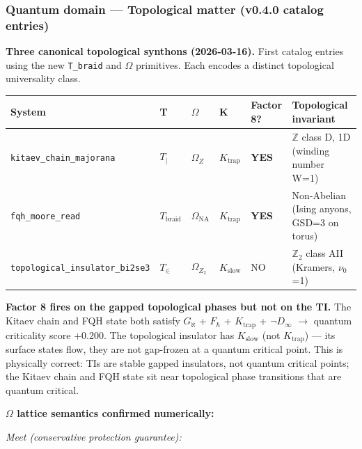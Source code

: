 \documentclass[12pt,a4paper]{article}
\begin{document}
\subsubsection{Quantum domain --- Topological matter (v0.4.0 catalog entries)}

\textbf{Three canonical topological synthons (2026-03-16).} First catalog entries using the new \texttt{T\_braid} and $\Omega$ primitives. Each encodes a distinct topological universality class.

\begin{table}[htbp]
\centering
\small
{}
\begin{tabularx}{\textwidth}{>{\centering\arraybackslash}X >{\centering\arraybackslash}X >{\centering\arraybackslash}X >{\centering\arraybackslash}X >{\centering\arraybackslash}X >{\centering\arraybackslash}X}
\toprule
\rowcolor{gray!25}\textbf{System} & \textbf{T} & \textbf{$\Omega$} & \textbf{K} & \textbf{Factor 8?} & \textbf{Topological invariant} \\
\midrule
\rowcolors{1}{white}{gray!10}
\texttt{kitaev\_chain\_majorana} & $T_{|}$ & $\Omega_Z$ & $K_{\text{trap}}$ & \textbf{YES} & $\mathbb{Z}$ class D, 1D (winding number W=1) \\
\texttt{fqh\_moore\_read} & $T_{\text{braid}}$ & $\Omega_{\text{NA}}$ & $K_{\text{trap}}$ & \textbf{YES} & Non-Abelian (Ising anyons, GSD=3 on torus) \\
\texttt{topological\_insulator\_bi2se3} & $T_{\in}$ & $\Omega_{Z_2}$ & $K_{\text{slow}}$ & NO & $\mathbb{Z}_2$ class AII (Kramers, $\nu_0$=1) \\
\bottomrule
\end{tabularx}
\end{table}

\textbf{Factor 8 fires on the gapped topological phases but not on the TI.} The Kitaev chain and FQH state both satisfy $G_{\aleph}$ + $F_{\hbar}$ + $K_{\text{trap}}$ + $\neg D_{\infty}$ $\to$ quantum criticality score +0.200. The topological insulator has $K_{\text{slow}}$ (not $K_{\text{trap}}$) --- its surface states flow, they are not gap-frozen at a quantum critical point. This is physically correct: TIs are stable gapped insulators, not quantum critical points; the Kitaev chain and FQH state sit near topological phase transitions that are quantum critical.

\textbf{$\Omega$ lattice semantics confirmed numerically:}

\emph{Meet (conservative protection guarantee):}
\end{document}
